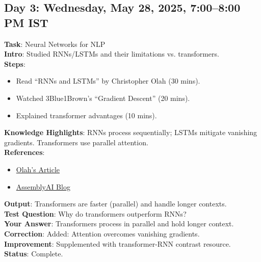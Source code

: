 \documentclass[a4paper,12pt]{article}
\begin{document}
\subsection*{Day 3: Wednesday, May 28, 2025, 7:00--8:00 PM IST}
\textbf{Task}: Neural Networks for NLP \\
\textbf{Intro}: Studied RNNs/LSTMs and their limitations vs. transformers. \\
\textbf{Steps}:
\begin{itemize}
    \item Read ``RNNs and LSTMs'' by Christopher Olah (30 mins).
    \item Watched 3Blue1Brown’s ``Gradient Descent'' (20 mins).
    \item Explained transformer advantages (10 mins).
\end{itemize}
\textbf{Knowledge Highlights}: RNNs process sequentially; LSTMs mitigate vanishing gradients. Transformers use parallel attention. \\
\textbf{References}: 
\begin{itemize}
    \item \href{https://colah.github.io/posts/2015-08-Understanding-LSTMs}{Olah’s Article}
    \item \href{https://www.assemblyai.com/blog/transformers-vs-rnns}{AssemblyAI Blog}
\end{itemize}
\textbf{Output}: Transformers are faster (parallel) and handle longer contexts. \\
\textbf{Test Question}: Why do transformers outperform RNNs? \\
\textbf{Your Answer}: Transformers process in parallel and hold longer context. \\
\textbf{Correction}: Added: Attention overcomes vanishing gradients. \\
\textbf{Improvement}: Supplemented with transformer-RNN contrast resource. \\
\textbf{Status}: Complete.

\end{document}
